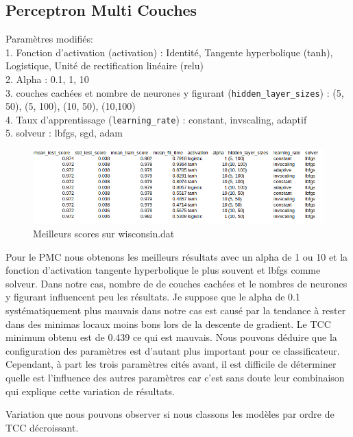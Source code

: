 \documentclass[10pt,letterpaper]{article}
\begin{document}
\subsection*{Perceptron Multi Couches}
Paramètres modifiés:\\
    1. Fonction d’activation (activation) : Identité, Tangente hyperbolique (tanh), Logistique, Unité de rectification linéaire (relu)\\
    2. Alpha : 0.1, 1, 10\\
    3. couches cachées et nombre de neurones y figurant (\verb!hidden_layer_sizes!) : (5, 50), (5, 100), (10, 50), (10,100)\\
    4. Taux d’apprentissage (\verb!learning_rate!) : constant, invscaling, adaptif\\
    5.  solveur : lbfgs, sgd, adam\\


\begin{figure}[H]
\centering
\includegraphics[scale=0.65]{wisc_pmc_1.png}
\caption{Meilleurs scores sur wisconsin.dat}
\end{figure}

Pour le PMC nous obtenons les meilleurs résultats avec un alpha de 1 ou 10 et la fonction d’activation tangente hyperbolique le plus souvent et lbfgs comme solveur.
Dans notre cas, nombre de de couches cachées et le nombres de neurones y figurant influencent peu les résultats.
Je suppose que le alpha de 0.1 systématiquement plus mauvais dans notre cas est causé par la tendance à rester dans des minimas locaux moins bons lors de la descente de gradient.
\newpage
Le TCC minimum obtenu est de 0.439 ce qui est mauvais. Nous pouvons déduire que la configuration des paramètres est d’autant plus important pour ce classificateur. Cependant, à part les trois paramètres cités avant, il est difficile de déterminer quelle est l’influence des autres paramètres car c’est sans doute leur combinaison qui explique cette variation de résultats.

Variation que nous pouvons observer si nous classons les modèles par ordre de TCC décroissant.
\end{document}
